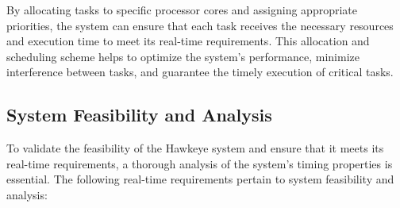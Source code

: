 \documentclass[a4paper,11pt]{article}%
\begin{document}
By allocating tasks to specific processor cores and assigning appropriate priorities, the system can ensure that each task receives the necessary resources and execution time to meet its real-time requirements. This allocation and scheduling scheme helps to optimize the system's performance, minimize interference between tasks, and guarantee the timely execution of critical tasks.

\subsection{System Feasibility and Analysis}
To validate the feasibility of the Hawkeye system and ensure that it meets its real-time requirements, a thorough analysis of the system's timing properties is essential. The following real-time requirements pertain to system feasibility and analysis:
\end{document}
